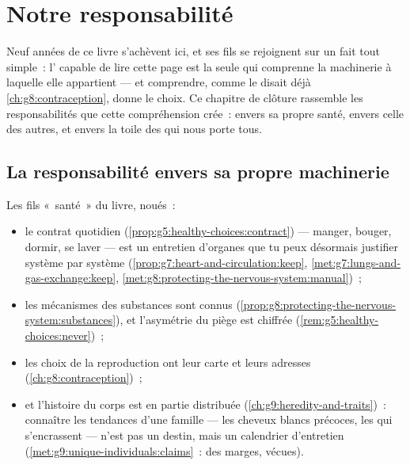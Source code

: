 \chapter{Notre responsabilité}\label{ch:g9:our-responsibility}

Neuf années de ce livre s'achèvent ici, et ses fils se
rejoignent sur un fait tout simple~: l' capable de
lire cette page est la seule  qui comprenne la
machinerie à laquelle elle appartient --- et comprendre,
comme le disait déjà \cref{ch:g8:contraception}, donne le
choix. Ce chapitre de clôture rassemble les responsabilités
que cette compréhension crée~: envers sa propre santé,
envers celle des autres, et envers la toile des  qui nous porte tous.

\section{La responsabilité envers sa propre machinerie}

\begin{proposition}\label{prop:g9:our-responsibility:self}
Les fils «~santé~» du livre, noués~:
\begin{itemize}
  \item le contrat quotidien
        (\cref{prop:g5:healthy-choices:contract}) ---
        manger, bouger, dormir, se laver --- est un
        entretien d'organes que tu peux désormais justifier
        système par système
        (\cref{prop:g7:heart-and-circulation:keep},
        \cref{met:g7:lungs-and-gas-exchange:keep},
        \cref{met:g8:protecting-the-nervous-system:manual})~;
  \item les mécanismes des substances sont connus
        (\cref{prop:g8:protecting-the-nervous-system:substances}),
        et l'asymétrie du piège est chiffrée
        (\cref{rem:g5:healthy-choices:never})~;
  \item les choix de la reproduction ont leur carte et
        leurs adresses (\cref{ch:g8:contraception})~;
  \item et l'histoire du corps est en partie distribuée
        (\cref{ch:g9:heredity-and-traits})~: connaître les
        tendances d'une famille --- les cheveux blancs
        précoces, les  qui s'encrassent --- n'est pas
        un destin, mais un calendrier d'entretien
        (\cref{met:g9:unique-individuals:claims}~: des
        marges, vécues).
\end{itemize}
\end{proposition}
\admitted

